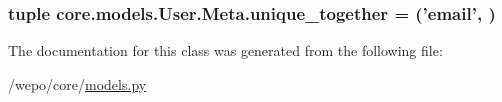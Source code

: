 \hypertarget{classcore_1_1models_1_1User_1_1Meta_a030339a038db1635e1ba894044e7a4ff}{
\subsubsection[{unique\-\_\-together}]{\setlength{\rightskip}{0pt plus 5cm}tuple core.\-models.\-User.\-Meta.\-unique\-\_\-together = ('{\bf email}', )\hspace{0.3cm}{\ttfamily [static]}}}\label{classcore_1_1models_1_1User_1_1Meta_a030339a038db1635e1ba894044e7a4ff}


The documentation for this class was generated from the following file\-:\begin{DoxyCompactItemize}
\item 
/wepo/core/\hyperlink{models_8py}{models.\-py}\end{DoxyCompactItemize}
